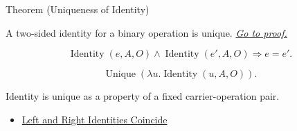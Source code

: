 \begin{theorembox}{Theorem (Uniqueness of Identity)}
\begin{theorem}
\label{thm:uniqueness-of-identity}
A two-sided identity for a binary operation is unique.
\hyperref[prf:uniqueness-of-identity]{\textit{Go to proof.}}
\end{theorem}
\end{theorembox}

\begin{remark*}
\[
\operatorname{Identity}(e,A,O)\land\operatorname{Identity}(e',A,O)
\Longrightarrow e=e'.
\]
\end{remark*}

\begin{remark*}
\[
\operatorname{Unique}(\lambda u.\operatorname{Identity}(u,A,O)).
\]
\end{remark*}

\begin{remark*}[Interpretation]
Identity is unique as a property of a fixed carrier-operation pair.
\end{remark*}

\begin{dependencies}
\begin{itemize}
  \item \hyperref[lem:left-right-identities-coincide]{Left and Right Identities Coincide}
\end{itemize}
\end{dependencies}
